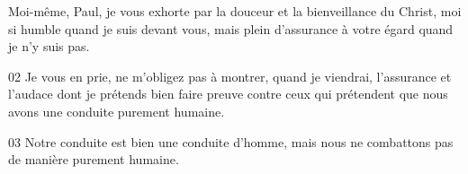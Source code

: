  Moi-même, Paul, je vous exhorte par la douceur et la bienveillance du Christ, moi si humble quand je suis devant vous, mais plein d’assurance à votre égard quand je n’y suis pas.

02 Je vous en prie, ne m’obligez pas à montrer, quand je viendrai, l’assurance et l’audace dont je prétends bien faire preuve contre ceux qui prétendent que nous avons une conduite purement humaine.

03 Notre conduite est bien une conduite d’homme, mais nous ne combattons pas de manière purement humaine.

